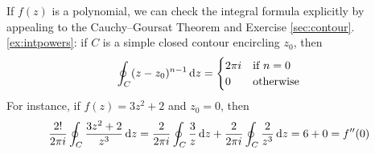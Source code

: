 \begin{example}{}{}
	If $f(z)$ is a polynomial, we can check the integral formula explicitly by appealing to the Cauchy--Goursat Theorem and Exercise \ref*{sec:contour}.\ref{ex:intpowers}: if $C$ is a simple closed contour encircling $z_0$, then 
	\[
		\oint_C(z-z_0)^{n-1}\,{\mathrm{d} z}=
	 	\begin{cases}
	  	2\pi i&\text{if }n=0\\
	  	0&\text{otherwise}
	 	\end{cases}
	\]
	For instance, if $f(z)=3z^2+2$ and $z_0=0$, then
	\begin{gather*}
		\frac{2!}{2\pi i}\oint_C\frac{3z^2+2}{z^3}\,{\mathrm{d} z}=\frac 2{2\pi i}\oint_C\frac 3z\,{\mathrm{d} z}+\frac 2{2\pi i}\oint_C\frac{2}{z^3}\,{\mathrm{d} z} =6+0=f''(0)
	\end{gather*}
\end{example}


